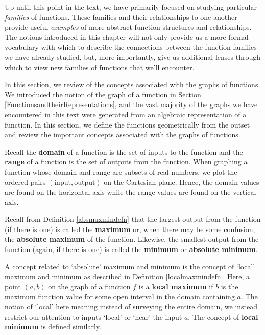 

\setcounter{footnote}{0}

\label{GraphsofFunctions}

Up until this point in the text, we have primarily focused on studying particular \textit{families} of functions.  These families and their relationships to one another provide useful \textit{examples} of more abstract function structures and relationships.  The notions introduced in this chapter will not only provide us a more formal vocabulary with which to describe the connections between the function families we have already studied, but, more importantly,  give us additional lenses through which to  view  new families of functions that we'll encounter.

In this section, we review of the concepts associated with the graphs of functions.  We introduced the notion of the graph of a function  in Section \ref{FunctionsandtheirRepresentations}, and the vast majority of the graphs we have encountered in this text were generated from an algebraic representation of a function.  In this section, we define the functions geometrically from the outset and review the important concepts associated with the graphs of functions.

Recall the \textbf{domain} of a function is the set of inputs to the function and the \textbf{range} of a function is the set of outputs from the function.  When graphing a function whose domain and range are subsets of real numbers, we plot the ordered pairs $(\text{input}, \text{output})$ on the Cartesian plane.  Hence, the domain values are found on the horizontal axis while the range values are found on the vertical axis.

Recall from Definition \ref{absmaxmindefn} that the largest output from the function (if there is one) is called the \textbf{maximum} or, when there may be some confusion, the \textbf{absolute maximum} of the function.  Likewise, the smallest output from the function (again, if there is one) is called the \textbf{minimum} or \textbf{absolute minimum}.  

A concept related to `absolute' maximum and minimum is the concept of `local'  maximum and minimum as described in  Definition \ref{localmaxmindefn}.  Here, a point $(a,b)$ on the graph of a function $f$ is a \textbf{local maximum} if $b$ is the maximum function value for some open interval in the domain containing $a$.  The notion of `local' here meaning instead of surveying the entire domain, we instead restrict our attention to inputs `local' or `near' the input $a$.  The concept of \textbf{local minimum} is defined similarly.

